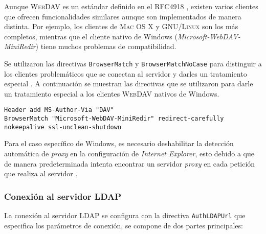 Aunque \textsc{WebDAV} es un est\'{a}ndar definido en el RFC4918 \cite{_rfc_????-2}, existen varios clientes que ofrecen funcionalidades similares aunque son implementados de manera distinta. Por ejemplo, los clientes de \textsc{Mac OS X} y \textsc{GNU/Linux} son los m\'{a}s completos, mientras que el cliente nativo de Windows (\textit{Microsoft-WebDAV-MiniRedir}) tiene muchos problemas de compatibilidad.

Se utilizaron las directivas \texttt{BrowserMatch} y \texttt{BrowserMatchNoCase} para distinguir a los clientes problem\'{a}ticos que se conectan al servidor y darles un tratamiento especial \cite{_webdav_????} \cite{_fixing_????}. A continuaci\'{o}n se muestran las directivas que se utilizaron para darle un tratamiento especial a los clientes \textsc{WebDAV} nativos de Windows.

{
\scriptsize
\linespread{1}
\begin{verbatim}
Header add MS-Author-Via "DAV" 
BrowserMatch "Microsoft-WebDAV-MiniRedir" redirect-carefully nokeepalive ssl-unclean-shutdown 
\end{verbatim}
}

Para el caso espec\'{i}fico de Windows, es necesario deshabilitar la detecci\'{o}n autom\'{a}tica de \textit{proxy} en la configuraci\'{o}n de \emph{Internet Explorer}, esto debido a que de manera predeterminada intenta encontrar un servidor \textit{proxy} en cada petici\'{o}n que realiza al servidor \cite{oddball_fix_????} \cite{_slow_????} \cite{_using_????}.

        \subsubsection {Conexi\'{o}n al servidor \textsc{LDAP}}

La conexi\'{o}n al servidor LDAP se configura con la directiva \texttt{AuthLDAPUrl} que especifica los par\'{a}metros de conexi\'{o}n, se compone de dos partes principales:

{
 \begin{table}[H]
 \caption{Par\'{a}metros de conexi\'{o}n \texttt{LDAP}}{}
 \label{tab:ldap-parameters}
 \noindent{} %
 \end{table}
}

